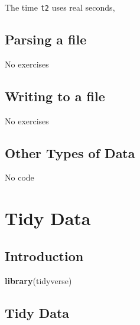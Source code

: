 \documentclass[]{book}
\newenvironment{Shaded}{\begin{snugshade}}{\end{snugshade}}
\newcommand{\CommentTok}[1]{\textcolor[rgb]{0.56,0.35,0.01}{\textit{#1}}}
\newcommand{\KeywordTok}[1]{\textcolor[rgb]{0.13,0.29,0.53}{\textbf{#1}}}
\newcommand{\NormalTok}[1]{#1}
\newcommand{\StringTok}[1]{\textcolor[rgb]{0.31,0.60,0.02}{#1}}
\theoremstyle{definition}
\theoremstyle{definition}
\theoremstyle{definition}
\theoremstyle{remark}
\begin{document}
The time \texttt{t2} uses real seconds,

\begin{Shaded}
\end{Shaded}

\hypertarget{parsing-a-file}{%
\section{Parsing a file}\label{parsing-a-file}}

No exercises

\hypertarget{writing-to-a-file}{%
\section{Writing to a file}\label{writing-to-a-file}}

No exercises

\hypertarget{other-types-of-data}{%
\section{Other Types of Data}\label{other-types-of-data}}

No code

\hypertarget{tidy-data}{%
\chapter{Tidy Data}\label{tidy-data}}

\hypertarget{introduction-6}{%
\section{Introduction}\label{introduction-6}}

\begin{Shaded}
\begin{Highlighting}[]
\KeywordTok{library}\NormalTok{(tidyverse)}
\end{Highlighting}
\end{Shaded}

\hypertarget{tidy-data-1}{%
\section{Tidy Data}\label{tidy-data-1}}
\end{document}

